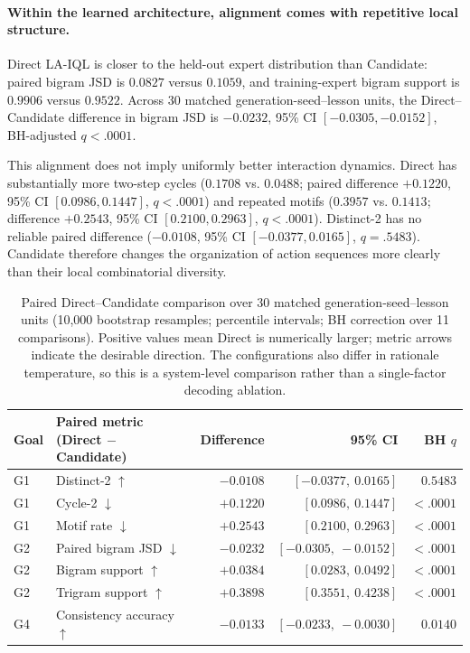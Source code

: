 \documentclass[manuscript,review,anonymous]{acmart}
\begin{document}
\paragraph{Within the learned architecture, alignment comes with repetitive local structure.}
Direct LA-IQL is closer to the held-out expert
distribution than Candidate: paired bigram JSD is $0.0827$ versus $0.1059$,
and training-expert bigram support is $0.9906$ versus $0.9522$. Across 30
matched generation-seed--lesson units, the Direct--Candidate difference in bigram JSD is
$-0.0232$, 95\% CI $[-0.0305,-0.0152]$, BH-adjusted $q<.0001$.

This alignment does not imply uniformly better interaction dynamics. Direct
has substantially more two-step cycles ($0.1708$ vs. $0.0488$; paired
difference $+0.1220$, 95\% CI $[0.0986,0.1447]$, $q<.0001$) and repeated
motifs ($0.3957$ vs. $0.1413$; difference $+0.2543$, 95\% CI
$[0.2100,0.2963]$, $q<.0001$). Distinct-2 has no reliable paired difference
($-0.0108$, 95\% CI $[-0.0377,0.0165]$, $q=.5483$). Candidate therefore
changes the organization of action sequences more clearly than their local
combinatorial diversity.

\begin{table}[t]
\centering
\small
\setlength{\tabcolsep}{4pt}
\begin{tabular}{llrrr}
\toprule
Goal & Paired metric (Direct $-$ Candidate) & Difference & 95\% CI & BH $q$ \\
\midrule
G1 & Distinct-2 $\uparrow$ & $-0.0108$ & $[-0.0377,\ 0.0165]$ & $0.5483$ \\
G1 & Cycle-2 $\downarrow$ & $+0.1220$ & $[0.0986,\ 0.1447]$ & $<.0001$ \\
G1 & Motif rate $\downarrow$ & $+0.2543$ & $[0.2100,\ 0.2963]$ & $<.0001$ \\
G2 & Paired bigram JSD $\downarrow$ & $-0.0232$ & $[-0.0305,\ -0.0152]$ & $<.0001$ \\
G2 & Bigram support $\uparrow$ & $+0.0384$ & $[0.0283,\ 0.0492]$ & $<.0001$ \\
G2 & Trigram support $\uparrow$ & $+0.3898$ & $[0.3551,\ 0.4238]$ & $<.0001$ \\
G4 & Consistency accuracy $\uparrow$ & $-0.0133$ & $[-0.0233,\ -0.0030]$ & $0.0140$ \\
\bottomrule
\end{tabular}
\caption{Paired Direct--Candidate comparison over 30 matched generation-seed--lesson
units (10,000 bootstrap resamples; percentile intervals; BH correction over
11 comparisons). Positive values mean Direct is numerically larger; metric
arrows indicate the desirable direction. The configurations also differ in
rationale temperature, so this is a system-level comparison rather than a
single-factor decoding ablation.}
\label{tab:direct-candidate-paired}
\end{table}
\end{document}
